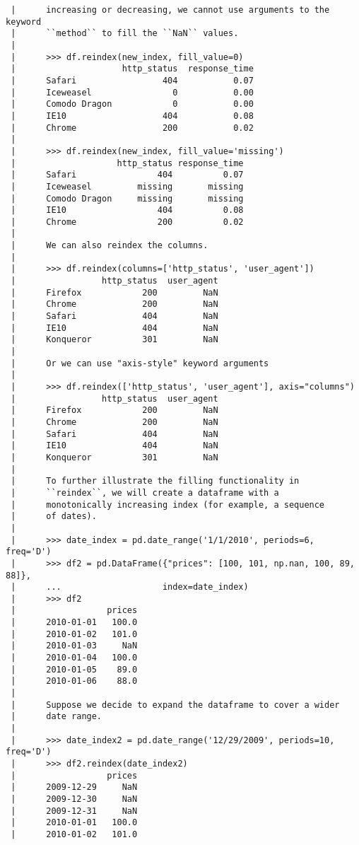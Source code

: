 \documentclass[
  letterpaper,
  DIV=11,
  numbers=noendperiod]{scrreprt}
\begin{document}
\begin{verbatim}
 |      increasing or decreasing, we cannot use arguments to the keyword
 |      ``method`` to fill the ``NaN`` values.
 |      
 |      >>> df.reindex(new_index, fill_value=0)
 |                     http_status  response_time
 |      Safari                 404           0.07
 |      Iceweasel                0           0.00
 |      Comodo Dragon            0           0.00
 |      IE10                   404           0.08
 |      Chrome                 200           0.02
 |      
 |      >>> df.reindex(new_index, fill_value='missing')
 |                    http_status response_time
 |      Safari                404          0.07
 |      Iceweasel         missing       missing
 |      Comodo Dragon     missing       missing
 |      IE10                  404          0.08
 |      Chrome                200          0.02
 |      
 |      We can also reindex the columns.
 |      
 |      >>> df.reindex(columns=['http_status', 'user_agent'])
 |                 http_status  user_agent
 |      Firefox            200         NaN
 |      Chrome             200         NaN
 |      Safari             404         NaN
 |      IE10               404         NaN
 |      Konqueror          301         NaN
 |      
 |      Or we can use "axis-style" keyword arguments
 |      
 |      >>> df.reindex(['http_status', 'user_agent'], axis="columns")
 |                 http_status  user_agent
 |      Firefox            200         NaN
 |      Chrome             200         NaN
 |      Safari             404         NaN
 |      IE10               404         NaN
 |      Konqueror          301         NaN
 |      
 |      To further illustrate the filling functionality in
 |      ``reindex``, we will create a dataframe with a
 |      monotonically increasing index (for example, a sequence
 |      of dates).
 |      
 |      >>> date_index = pd.date_range('1/1/2010', periods=6, freq='D')
 |      >>> df2 = pd.DataFrame({"prices": [100, 101, np.nan, 100, 89, 88]},
 |      ...                    index=date_index)
 |      >>> df2
 |                  prices
 |      2010-01-01   100.0
 |      2010-01-02   101.0
 |      2010-01-03     NaN
 |      2010-01-04   100.0
 |      2010-01-05    89.0
 |      2010-01-06    88.0
 |      
 |      Suppose we decide to expand the dataframe to cover a wider
 |      date range.
 |      
 |      >>> date_index2 = pd.date_range('12/29/2009', periods=10, freq='D')
 |      >>> df2.reindex(date_index2)
 |                  prices
 |      2009-12-29     NaN
 |      2009-12-30     NaN
 |      2009-12-31     NaN
 |      2010-01-01   100.0
 |      2010-01-02   101.0

\end{verbatim}
\end{document}
